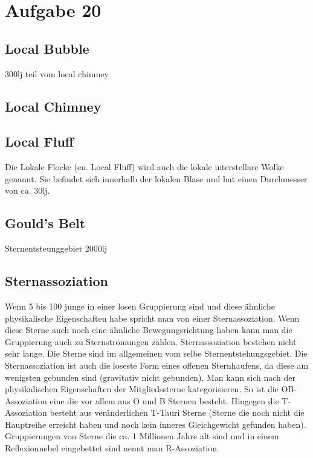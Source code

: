 \section{Aufgabe 20}
\subsection{Local Bubble}
300lj
teil vom local chimney
\subsection{Local Chimney}
\subsection{Local Fluff}
Die Lokale Flocke (en. Local Fluff) wird auch die lokale interstellare Wolke genannt. Sie befindet sich innerhalb der lokalen Blase und hat einen Durchmesser von ca. 30lj.
\subsection{Gould's Belt}
Sternentsteunggebiet 2000lj
\subsection{Sternassoziation}
Wenn 5 bis 100 junge in einer losen Gruppierung sind und diese ähnliche physikalische Eigenschaften habe spricht man von einer Sternassoziation. Wenn diese Sterne auch noch eine ähnliche Bewegungsrichtung haben kann man die Gruppierung auch zu Sternströmungen zählen. Sternassoziation bestehen nicht sehr lange. Die Sterne sind im allgemeinen vom selbe Sternentstehungsgebiet. Die Sternassoziation ist auch die loseste Form eines offenen Sternhaufens, da diese am wenigsten gebunden sind (gravitativ nicht gebunden). Man kann sich nach der physikalischen Eigenschaften der Mitgliedssterne kategorisieren. 
So ist die OB-Assoziation eine die vor allem aus O und B Sternen besteht. Hingegen die T-Assoziation besteht aus veränderlichen T-Tauri Sterne (Sterne die noch nicht die Hauptreihe erreicht haben und noch kein inneres Gleichgewicht gefunden haben).
Gruppierungen von Sterne die ca. 1 Millionen Jahre alt sind und in einem Reflexionnebel eingebettet sind nennt man R-Assoziation.
